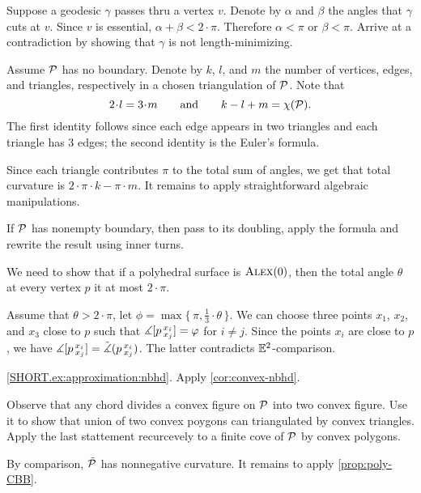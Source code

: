 Suppose a geodesic $\gamma$ passes thru a vertex $v$.
Denote by $\alpha$ and $\beta$ the angles that $\gamma$ cuts at $v$.
Since $v$ is essential, $\alpha+\beta<2\cdot\pi$.
Therefore $\alpha<\pi$ or $\beta<\pi$.
Arrive at a contradiction by showing that $\gamma$ is not length-minimizing.

Assume $\mathcal{P}$ has no boundary.
Denote by $k$, $l$, and $m$ the number of vertices, edges, and triangles, respectively in a chosen triangulation of $\mathcal{P}$.
Note that
\[2\cdot l=3\cdot m
\qquad\text{and}\qquad
k-l+m=\chi(\spc{P}).\]
The first identity follows since each edge appears in two triangles and each triangle has 3 edges;
the second identity is the Euler's formula.

Since each triangle contributes $\pi$ to the total sum of angles, we get that total curvature is $2\cdot\pi\cdot k-\pi\cdot m$.
It remains to apply straightforward algebraic manipulations.

If $\mathcal{P}$ has nonempty boundary, then pass to its doubling, apply the formula and rewrite the result using inner turns.

We need to show that if a polyhedral surface is $\textsc{Alex}(0)$, then the total angle $\theta$ at every vertex $p$ it at most $2\cdot\pi$.

Assume that $\theta>2\cdot\pi$,
let $\phi=\max\{\,\pi,\tfrac13\cdot\theta\,\}$.
We can choose three points $x_1$, $x_2$, and $x_3$ close to $p$ such that
$\measuredangle [p\,{}^{x_i}_{x_j}]=\varphi$ for $i\ne j$.
Since the points $x_i$ are close to $p$, we have $\measuredangle [p\,{}^{x_i}_{x_j}]=\tilde\measuredangle(p\,{}^{x_i}_{x_j})$.
The latter contradicts $\mathbb{E}^2$-comparison.

\ref{SHORT.ex:approximation:nbhd}.
Apply \ref{cor:convex-nbhd}.

Observe that any chord divides a convex figure on $\mathcal{P}$ into two convex figure.
Use it to show that union of two convex poygons can triangulated by convex triangles.
Apply the last stattement recurcevely to a finite cove of $\mathcal{P}$ by convex polygons.

By comparison, $\tilde{\mathcal{P}}$ has nonnegative curvature.
It remains to apply \ref{prop:poly-CBB}.


